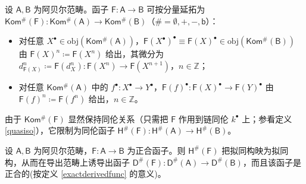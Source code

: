 \begin{Def}
	设 $\mathsf{A}, \mathsf{B}$ 为阿贝尔范畴。函子 $\mathsf{F}:\mathsf{A}\rightarrow\mathsf{B}$ 可按分量延拓为 $\mathsf{Kom^\#\!(F)}:\mathsf{Kom^\#\!(A)}\rightarrow\mathsf{Kom^\#\!(B)}$（$\#=\emptyset,+,-,\mathsf{b}$）：
	\begin{itemize}[leftmargin=0.5cm]
		\renewcommand{\labelitemi}{\textendash}
		\item 对任意 $X^\bullet\in\text{obj}(\mathsf{Kom^\#\!(A)})$，$\mathsf{F}(X^\bullet)^\bullet\equiv\mathsf{F}(X)^\bullet\in\text{obj}(\mathsf{Kom^\#\!(B)})$ 由 $\mathsf{F}(X)^n\coloneqq\mathsf{F}(X^n)$ 给出，其微分为 $d_{\mathsf{F}(X)}^n\coloneqq \mathsf{F}(d_X^n):\mathsf{F}(X^n)\rightarrow\mathsf{F}(X^{n+1})$，$n\in\mathbb{Z}$；
		
		\item 对任意 $\mathsf{Kom^\#\!(A)}$ 中的 $f^\bullet:X^\bullet\rightarrow Y^\bullet$，$\mathsf{F}(f)^\bullet:\mathsf{F}(X)^\bullet\rightarrow\mathsf{F}(Y)^\bullet$ 由 $\mathsf{F}(f)^n\coloneqq \mathsf{F}(f^n)$ 给出，$n\in\mathbb{Z}$。
	\end{itemize}
	由于 $\mathsf{Kom^\#\!(F)}$ 显然保持同伦关系（只需把 $\mathsf{F}$ 作用到链同伦 $k^\bullet$ 上；参看定义 \ref{quasiso}），它限制为同伦函子 $\mathsf{H^\#\!(F)}:\mathsf{H^\#\!(A)}\rightarrow\mathsf{H^\#\!(B)}$。
\end{Def}

\begin{Pro}\label{D(F)exact}
	设 $\mathsf{A}, \mathsf{B}$ 为阿贝尔范畴，$\mathsf{F}:\mathsf{A}\rightarrow\mathsf{B}$ 为正合函子。则 $\mathsf{H^\#\!(F)}$ 把拟同构映为拟同构，从而在导出范畴上诱导出函子 $\mathsf{D^\#\!(F)}:\mathsf{D^\#\!(A)}\rightarrow\mathsf{D^\#\!(B)}$，而且该函子是正合的\textup(按定义 \ref{exactderivedfunc} 的意义\textup)。
\end{Pro}

